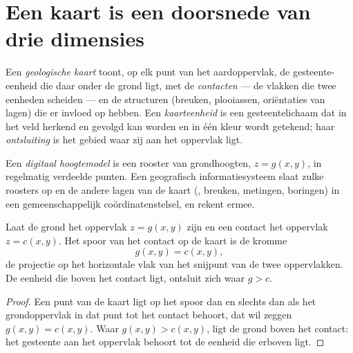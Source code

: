 \section{Een kaart is een doorsnede van drie dimensies}\label{sec:b1:geological-maps:cut}

\begin{definition}\label{def:b1:geological-maps:geological-map}
Een \emph{geologische kaart} toont, op elk punt van het aardoppervlak,
de gesteente-eenheid die daar onder de grond ligt, met de \emph{contacten} ---
de vlakken die twee eenheden scheiden --- en de structuren (breuken, plooiassen, oriëntaties van
lagen) die er invloed op hebben. Een \emph{kaarteenheid} is een gesteentelichaam
dat in het veld herkend en gevolgd kan worden en in één kleur wordt getekend; haar
\emph{ontsluiting} is het gebied waar zij aan het oppervlak ligt.
\end{definition}

\begin{definition}\label{def:b1:geological-maps:dem}
Een \emph{digitaal hoogtemodel} is een rooster van grondhoogten,
$z = g(x,y)$, in regelmatig verdeelde punten. Een geografisch informatiesysteem slaat zulke
roosters op en de andere lagen van de kaart (, breuken, metingen, boringen) in een
gemeenschappelijk coördinatenstelsel, en rekent ermee.
\end{definition}

\begin{proposition}\label{prop:b1:geological-maps:intersection}
Laat de grond het oppervlak $z = g(x,y)$ zijn en een contact het oppervlak
$z = c(x,y)$. Het spoor van het contact op de kaart is de kromme
\[
  g(x,y) = c(x,y),
\]
de projectie op het horizontale vlak van het snijpunt van de twee oppervlakken. De eenheid
die boven het contact ligt, ontsluit zich waar $g > c$.
\end{proposition}

\begin{proof}
Een punt van de kaart ligt op het spoor dan en slechts dan als het grondoppervlak in dat punt
tot het contact behoort, dat wil zeggen $g(x,y) = c(x,y)$. Waar $g(x,y) > c(x,y)$, ligt de
grond boven het contact: het gesteente aan het oppervlak behoort tot de eenheid die erboven ligt.
\end{proof}

